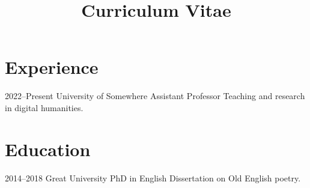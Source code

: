 \documentclass{curve}
\title{Curriculum Vitae}
\begin{document}
\makeprofile

\section{Experience}
\job
  {2022--Present}
  {University of Somewhere}
  {Assistant Professor}
  {Teaching and research in digital humanities.}

\section{Education}
\job
  {2014--2018}
  {Great University}
  {PhD in English}
  {Dissertation on Old English poetry.}
\end{document}
